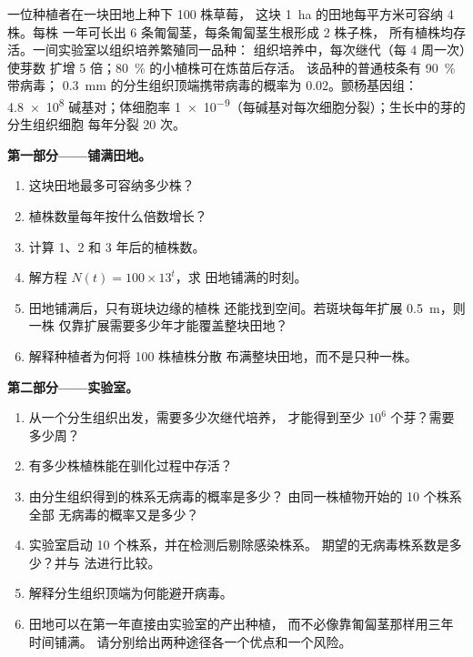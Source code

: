 \begin{problem}
\label{pb:b2:asexual-reproduction:1}
一位种植者在一块田地上种下 \num{100} 株草莓，
这块 \qty{1}{ha} 的田地每平方米可容纳 \num{4} 株。每株
一年可长出 \num{6} 条匍匐茎，每条匍匐茎生根形成 \num{2} 株子株，
所有植株均存活。一间实验室以组织培养繁殖同一品种：
组织培养中，每次继代（每 \num{4} 周一次）使芽数
扩增 \num{5} 倍；\qty{80}{\%} 的小植株可在炼苗后存活。
该品种的普通枝条有 \qty{90}{\%} 带病毒；
\qty{0.3}{mm} 的分生组织顶端携带病毒的概率为
$0.02$。颤杨基因组：\qty{4.8e8}{} 碱基对；体细胞率
\qty{1e-9}{}（每碱基对每次细胞分裂）；生长中的芽的分生组织细胞
每年分裂 \num{20} 次。

\medskip
\noindent\textbf{第一部分——铺满田地。}
\begin{enumerate}
  \item 这块田地最多可容纳多少株？
  \item 植株数量每年按什么倍数增长？
  \item 计算 1、2 和 3 年后的植株数。
  \item 解方程 $N(t) = 100\times 13^{t}$，求
        田地铺满的时刻。
  \item 田地铺满后，只有斑块边缘的植株
        还能找到空间。若斑块每年扩展 \qty{0.5}{m}，则一株
        仅靠扩展需要多少年才能覆盖整块田地？
  \item 解释种植者为何将 \num{100} 株植株分散
        布满整块田地，而不是只种一株。
\end{enumerate}

\medskip
\noindent\textbf{第二部分——实验室。}
\begin{enumerate}[resume]
  \item 从一个分生组织出发，需要多少次继代培养，
        才能得到至少 $10^{6}$ 个芽？需要多少周？
  \item 有多少株植株能在驯化过程中存活？
  \item 由分生组织得到的株系无病毒的概率是多少？
        由同一株植物开始的 \num{10} 个株系全部
        无病毒的概率又是多少？
  \item 实验室启动 \num{10} 个株系，并在检测后剔除感染株系。
        期望的无病毒株系数是多少？并与
        法进行比较。
  \item 解释分生组织顶端为何能避开病毒。
  \item 田地可以在第一年直接由实验室的产出种植，
        而不必像靠匍匐茎那样用三年时间铺满。
        请分别给出两种途径各一个优点和一个风险。
\end{enumerate}


\end{problem}
